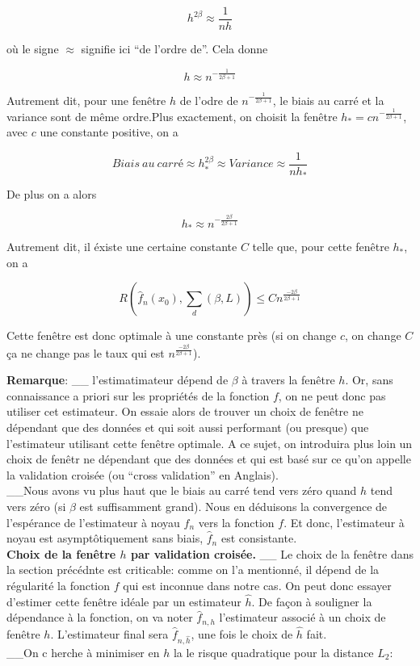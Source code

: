 \documentclass[
]{article}
\begin{document}
\[ 
  h^{2\beta}\approx\frac{1}{nh}
\]

où le signe \(\approx\) signifie ici ``de l'ordre de''. Cela donne

\[
  h\approx n^{-\frac{1}{2\beta +1}}
\]

Autrement dit, pour une fenêtre \(h\) de l'odre de
\(n^{-\frac{1}{2\beta+1}}\), le biais au carré et la variance sont de
même ordre.Plus exactement, on choisit la fenêtre
\(h_*=cn^{-\frac{1}{2\beta+1}}\), avec \(c\) une constante positive, on
a

\[
  Biais\ au\ carré \approx h_{*}^{2\beta}\approx Variance\approx \frac{1}{nh_{*}}
\]

De plus on a alors

\[
  h_* \approx n^{-\frac{2\beta}{2\beta + 1}}
\]

Autrement dit, il éxiste une certaine constante \(C\) telle que, pour
cette fenêtre \(h_*\), on a

\[
  R(\hat {f}_n(x_0),\sum_d(\beta,L))\leqslant Cn^{\frac{-2\beta}{2\beta + 1}}
\]

Cette fenêtre est donc optimale à une constante près (si on change
\(c\), on change \(C\) ça ne change pas le taux qui est
\(n^{\frac{-2\beta}{2\beta+1}}\)).

\textbf{Remarque}: \_\_ l'estimatimateur dépend de \(\beta\) à travers
la fenêtre \(h\). Or, sans connaissance a priori sur les propriétés de
la fonction \(f\), on ne peut donc pas utiliser cet estimateur. On
essaie alors de trouver un choix de fenêtre ne dépendant que des données
et qui soit aussi performant (ou presque) que l'estimateur utilisant
cette fenêtre optimale. A ce sujet, on introduira plus loin un choix de
fenêtr ne dépendant que des données et qui est basé sur ce qu'on appelle
la validation croisée (ou ``cross validation'' en Anglais).\\
\_\_Nous avons vu plus haut que le biais au carré tend vers zéro quand
\(h\) tend vers zéro (si \(\beta\) est suffisamment grand). Nous en
déduisons la convergence de l'espérance de l'estimateur à noyau
\(\hat {f}_n\) vers la fonction \(f\). Et donc, l'estimateur à noyau est
asymptôtiquement sans biais, \(\hat {f}_n\) est consistante.\\

\textbf{Choix de la fenêtre \(h\) par validation croisée.} \_\_ Le choix
de la fenêtre dans la section précédnte est criticable: comme on l'a
mentionné, il dépend de la régularité la fonction \(f\) qui est inconnue
dans notre cas. On peut donc essayer d'estimer cette fenêtre idéale par
un estimateur \(\hat {h}\). De façon à souligner la dépendance à la
fonction, on va noter \(\hat {f}_{n,h}\) l'estimateur associé à un choix
de fenêtre \(h\). L'estimateur final sera \(\hat{f}_{n,\hat{h}}\), une
fois le choix de \(\hat {h}\) fait.\\
\_\_On c herche à minimiser en \(h\) la le risque quadratique pour la
distance \(L_2\):
\end{document}
